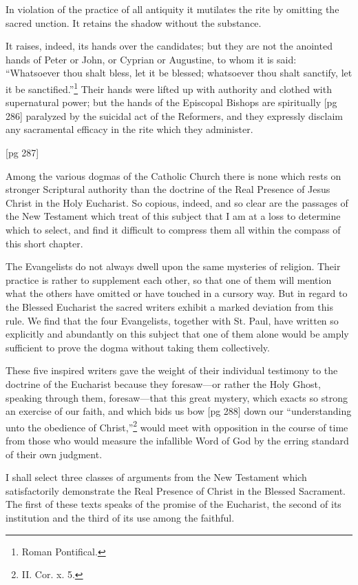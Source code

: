 In violation of the practice of all antiquity it
mutilates the rite by omitting the sacred unction.
It retains the shadow without the substance.

It raises, indeed, its hands over the candidates;
but they are not the anointed hands of Peter or
John, or Cyprian or Augustine, to whom it is said:
“Whatsoever thou shalt bless, let it be blessed;
whatsoever thou shalt sanctify, let it be
sanctified.”\footnote{Roman Pontifical.}
Their hands were lifted up with authority
and clothed with supernatural power; but the
hands of the Episcopal Bishops are spiritually
[pg 286]
paralyzed by the suicidal act of the Reformers,
and they expressly disclaim any sacramental efficacy
in the rite which they administer.

[pg 287]


Among the various dogmas of the Catholic
Church there is none which rests on stronger
Scriptural authority than the doctrine of
the Real Presence of Jesus Christ in the Holy
Eucharist. So copious, indeed, and so clear are
the passages of the New Testament which treat
of this subject that I am at a loss to determine
which to select, and find it difficult to compress
them all within the compass of this short chapter.

The Evangelists do not always dwell upon the
same mysteries of religion. Their practice is
rather to supplement each other, so that one of
them will mention what the others have omitted
or have touched in a cursory way. But in regard
to the Blessed Eucharist the sacred writers exhibit
a marked deviation from this rule. We find
that the four Evangelists, together with St. Paul,
have written so explicitly and abundantly on this
subject that one of them alone would be amply
sufficient to prove the dogma without taking them
collectively.

These five inspired writers gave the weight of
their individual testimony to the doctrine of the
Eucharist because they foresaw—or rather the
Holy Ghost, speaking through them, foresaw—that
this great mystery, which exacts so strong
an exercise of our faith, and which bids us bow
[pg 288]
down our “understanding unto the obedience of
Christ,”\footnote{II. Cor. x.
5.} would meet with opposition in the
course of time from those who would measure the
infallible Word of God by the erring standard of
their own judgment.

I shall select three classes of arguments from
the New Testament which satisfactorily demonstrate
the Real Presence of Christ in the Blessed
Sacrament. The first of these texts speaks of the
promise of the Eucharist, the second of its institution
and the third of its use among the faithful.

